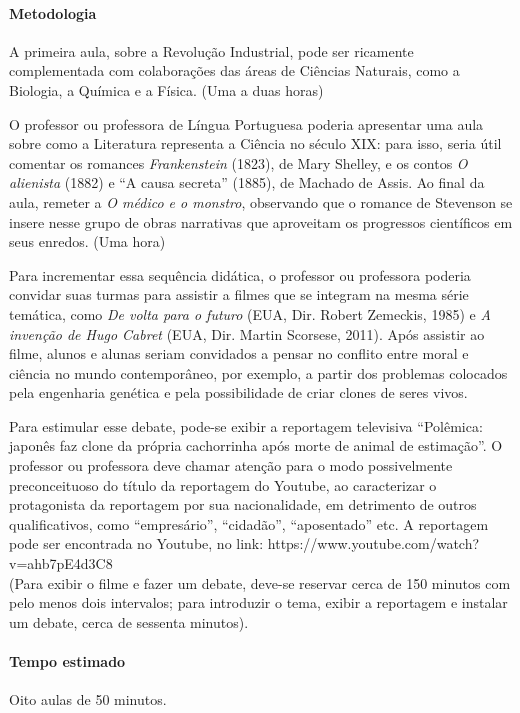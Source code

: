 \documentclass[12pt]{extarticle}
\begin{document}
\paragraph{Metodologia}
A primeira aula, sobre a Revolução Industrial, pode ser ricamente complementada
com colaborações das áreas de Ciências Naturais, como a Biologia, a
Química e a Física. (Uma a duas horas)

O professor ou professora de Língua Portuguesa poderia apresentar uma
aula sobre como a Literatura representa a Ciência no século XIX: para
isso, seria útil comentar os romances \emph{Frankenstein} (1823), de
Mary Shelley, e os contos \emph{O alienista} (1882) e ``A causa
secreta'' (1885), de Machado de Assis. Ao final da aula, remeter a
\emph{O médico e o monstro}, observando que o romance de Stevenson se
insere nesse grupo de obras narrativas que aproveitam os progressos
científicos em seus enredos. (Uma hora)

Para incrementar essa sequência didática, o professor ou professora
poderia convidar suas turmas para assistir a filmes que se integram na
mesma série temática, como \emph{De volta para o futuro} (EUA, Dir.
Robert Zemeckis, 1985) e \emph{A invenção de Hugo Cabret} (EUA, Dir.
Martin Scorsese, 2011). Após assistir ao filme, alunos e alunas seriam
convidados a pensar no conflito entre moral e ciência no mundo
contemporâneo, por exemplo, a partir dos problemas colocados pela
engenharia genética e pela possibilidade de criar clones de seres vivos.

Para estimular esse debate, pode-se exibir a reportagem televisiva
``Polêmica: japonês faz clone da própria cachorrinha após morte de
animal de estimação''. O professor ou professora deve chamar atenção
para o modo possivelmente preconceituoso do título da reportagem do
Youtube, ao caracterizar o protagonista da reportagem por sua
nacionalidade, em detrimento de outros qualificativos, como
``empresário'', ``cidadão'', ``aposentado'' etc. A reportagem pode ser
encontrada no Youtube, no link:
https://www.youtube.com/watch?v=ahb7pE4d3C8\\
(Para exibir o filme e fazer um debate, deve-se reservar cerca de 150
minutos com pelo menos dois intervalos; para introduzir o tema, exibir a
reportagem e instalar um debate, cerca de sessenta minutos).

\paragraph{Tempo estimado} Oito aulas de 50 minutos.
\end{document}
